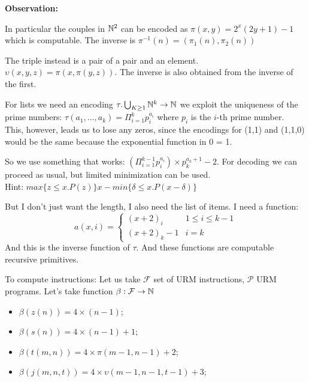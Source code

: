 \textbf{Observation:} 

In particular the couples in $ \mathbb{N}^2 $ can be encoded as
$ \pi(x,y) = 2^x(2y+1)-1 $ which is computable. The inverse is
$ \pi^{-1}(n) = (\pi_1(n), \pi_2(n)) $

The triple instead is a pair of a pair and an element.
$ \upsilon (x,y,z) = \pi (x, \pi(y,z))$. The inverse is also obtained
from the inverse of the first.

For lists we need an encoding
$ \tau . \bigcup_{K \geq 1} \mathbb{N}^k \rightarrow \mathbb{N} $ we exploit the
uniqueness of the prime numbers:
$ \tau(a_1,\dots,a_k) = \Pi_{i=1}^k p_i^{a_i}$ where $ p_i $ is the
$i$-th prime number. \\
This, however, leads us to lose any zeros, since
the encodings for (1,1) and (1,1,0) would be the same because the
exponential function in 0 = 1.

So we use something that works:
$ (\Pi_{i=1}^{k-1} p_i^{a_i}) \times p_k^{a_k+1} - 2$. For decoding we
can proceed as usual, but limited minimization can be used.\\ Hint:
$ max \{z \leq x . P(z)\} x - min\{\delta \leq x . P(x-\delta)\}$

But I don't just want the length, I also need the list of items. I
need a function:
\begin{equation*}
  a(x,i) = \begin{cases}
    (x+2)_i   & 1 \leq i \leq k-1 \\
    (x+2)_k-1 & i = k
  \end{cases}
\end{equation*}
And this is the inverse function of $\tau$. And these functions are
computable recursive primitives.

To compute instructions: Let us take $ \mathcal{F} $ set of URM
instructions, $ \mathcal{P} $ URM programs. Let's take function
$ \beta:\mathcal{F}\rightarrow\mathbb{N} $
\begin{itemize}
\item $ \beta(z(n)) = 4 \times (n-1) $;
\item $ \beta(s(n)) = 4 \times (n-1)+1 $;
\item $ \beta(t(m,n)) = 4 \times \pi(m-1,n-1)+2 $;
\item $ \beta(j(m,n,t)) = 4 \times \upsilon(m-1,n-1,t-1)+3 $;
\end{itemize}

